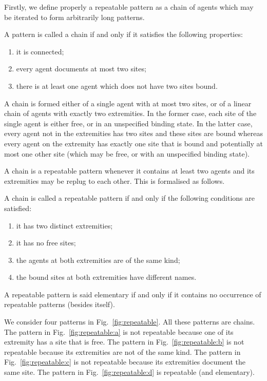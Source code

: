 \documentclass{entcs}
\begin{document}
Firstly, we define properly a repeatable pattern as a chain of agents which may be iterated to form arbitrarily long patterns.

\begin{defn}[chain]
A pattern is called a chain if and only if it satisfies the following properties:
\begin{enumerate}
  \item it is connected;
  \item every agent documents at most two sites;
  \item there is at least one agent which does not have two sites bound.
  \end{enumerate}
\end{defn}

A chain is formed either of a single agent with at most two sites, or of a linear chain of agents with exactly two extremities.
In the former case,
each site of the single agent is either free, or in an unspecified binding state. In the latter case, every agent not in the extremities has two sites and these sites are bound whereas every agent on the extremity has exactly one site that is bound and potentially at most one other site (which may be free, or with an unspecified binding state).

A chain is a repeatable pattern whenever it contains at least two agents and its extremities may be replug to each other. This is formalised as follows.

\begin{defn}
A chain is called a repeatable pattern if and only if the following conditions are satisfied:
\begin{enumerate}
\item it has two distinct extremities;
\item it has no free sites;
\item the agents at both extremities are of the same kind;
\item the bound sites at both extremities have different names.
\end{enumerate}
A repeatable pattern is said elementary if and only if it contains no occurrence of repeatable patterns (besides itself).
\end{defn}

\begin{exmp}
  We consider four patterns in Fig.~\ref{fig:repeatable}. All these patterns are chains. The pattern in Fig.~\ref{fig:repeatable:a} is not repeatable because one of its extremity has a site that is free. The pattern in Fig.~\ref{fig:repeatable:b} is not repeatable because its extremities are not of the same kind. The pattern in Fig.~\ref{fig:repeatable:c} is not repeatable because its extremities document the same site. The pattern in Fig.~\ref{fig:repeatable:d} is repeatable (and elementary).
\end{exmp}
\end{document}
